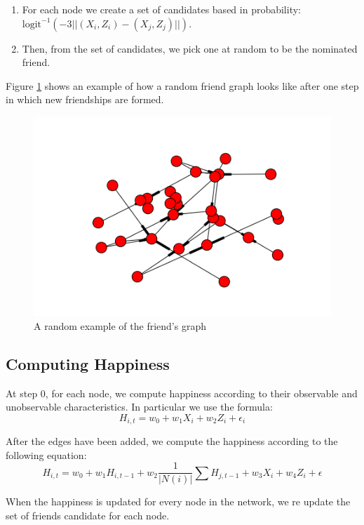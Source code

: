 \documentclass[11pt]{article}
\begin{document}
\begin{enumerate}
\item For each node we create a set of candidates based in probability: $\text{logit}^{-1} \left(-3||(X_i,Z_i)-(X_j,Z_j)||\right)$.
\item Then, from the set of candidates, we pick one at random to be the nominated friend.
\end{enumerate}

Figure \ref{fig:graph} shows an example of how a random friend graph looks like after one step in which new friendships are formed.

\begin{figure}[h]
\centering
\includegraphics[scale=.3]{example_graph.png}
\caption{A random example of the friend's graph }
\label{fig:graph}
\end{figure}

\FloatBarrier
\subsection{Computing Happiness}

At step 0, for each node, we compute happiness according to their observable and unobservable characteristics. In particular we use the formula:
$$H_{i,t} = w_0 +w_1 X_i+w_2 Z_i + \epsilon_i$$

 After the edges have been added, we compute the happiness according to the following equation:
$$H_{i,t} = w_0 +w_1 H_{i,t-1} + w_2 \frac{1}{|N(i)|} \sum\limits H_{j,t-1} + w_3 X_{i} + w_4 Z_{i} + \epsilon $$

When the happiness is updated for every node in the network, we re update the set of friends candidate for each node.\\
\end{document}
